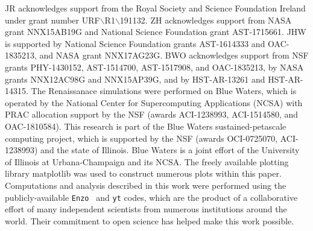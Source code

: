 \documentclass[graphics, twocolumn, usenatbib]{mn2e}
\newcommand{\enzo}{\texttt{Enzo~}}
\newcommand{\yt}{\texttt{yt}}
\begin{document}
JR acknowledges support from the Royal Society and Science Foundation Ireland under
grant number URF$\backslash$R1$\backslash$191132.
ZH acknowledges support from NASA grant NNX15AB19G and National Science Foundation grant AST-1715661.
JHW is supported by National Science Foundation grants AST-1614333 and
OAC-1835213, and NASA grant NNX17AG23G.  
BWO acknowledges support from NSF  grants  PHY-1430152,  AST-1514700, AST-1517908, and  OAC-1835213,  by  NASA grants NNX12AC98G and NNX15AP39G, and by HST-AR-13261 and HST-AR-14315.  
The Renaissanace simulations were performed on Blue 
Waters, which is operated by the National Center for Supercomputing Applications (NCSA)
with PRAC allocation support by the NSF (awards ACI-1238993, ACI-1514580, and OAC-1810584).
This research is part of the Blue Waters sustained-petascale computing project, which
is supported by the NSF (awards OCI-0725070, ACI-1238993) and the state of
Illinois. Blue Waters is a joint effort of the University of Illinois at
Urbana-Champaign and its NCSA.  The freely available plotting library {\sc
matplotlib} \citep{matplotlib} was used to construct numerous plots within this
paper. Computations and analysis described in this work were performed using the
publicly-available \enzo \citep{Enzo_2014, Enzo_2019} and \yt{} \citep{YT} codes, which are the product of a
collaborative effort of many independent scientists from numerous institutions
around the world. Their commitment to open science
has helped make this work possible.



\bsp
\label{lastpage}
\end{document}
